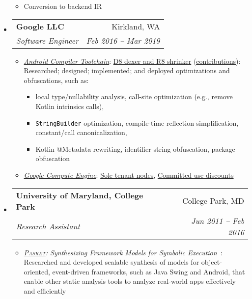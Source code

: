 \documentclass[letterpaper,11pt]{article}
\makeatletter
\newcommand{\ressubheading}[4]{
\begin{tabular*}{6.5in}{l@{\extracolsep{\fill}}r}
    \textbf{#1} & #2 \\
    \textit{#3} & \textit{#4} \\
\end{tabular*}\vspace{-6pt}}
\makeatother
\begin{document}
\begin{itemize}
{\begin{itemize}
\begin{itemize}
\item Conversion to backend IR
\end{itemize}
        \end{itemize}
        }
    \item
      \ressubheading{{Google LLC}}{Kirkland, WA}{Software Engineer}{Feb 2016 -- Mar 2019}
        {
\small
        \begin{itemize}
\item\emph{\href{https://developer.android.com/studio/preview/index.html}{Android Compiler Toolchain}}:
\href{https://r8.googlesource.com/r8}{D8 dexer and R8 shrinker} (\href{https://r8-review.googlesource.com/q/author:jsjeon+status:merged}{\underline{contributions}}):
Researched; designed; implemented; and deployed optimizations and obfuscations, such as:
\begin{itemize}
\item local type/nullability analysis, call-site optimization (e.g., remove Kotlin intrinsics calls),
\item \texttt{StringBuilder} optimization, compile-time reflection simplification, constant/call canonicalization,
\item Kotlin @Metadata rewriting, identifier string obfuscation, package obfuscation
\end{itemize}
\item\emph{\href{https://cloud.google.com/compute/}{Google Compute Engine}}:
\href{https://cloudplatform.googleblog.com/2018/06/Introducing-sole-tenant-nodes-for-Google-Compute-Engine.html}{Sole-tenant nodes},
\href{https://cloudplatform.googleblog.com/2017/09/committed-use-discounts-for-Google-Compute-Engine-now-generally-available.html}{Committed use discounts}
        \end{itemize}
        }
    \item
      \ressubheading{{University of Maryland, College Park}}{College Park, MD}{Research Assistant}{Jun 2011 -- Feb 2016}
        {
\small
        \begin{itemize}
\item\emph{\href{https://github.com/plum-umd/pasket}{\textsc{Pasket}}: Synthesizing Framework Models for Symbolic Execution}~\cite{FMSD17, icse16, fse15, cav15}: %
Researched and developed scalable synthesis of models for object-oriented,
event-driven frameworks, such as Java Swing and Android,
that enable other static analysis tools
to analyze real-world apps effectively and efficiently


\end{itemize}}
\end{itemize}
\end{document}
